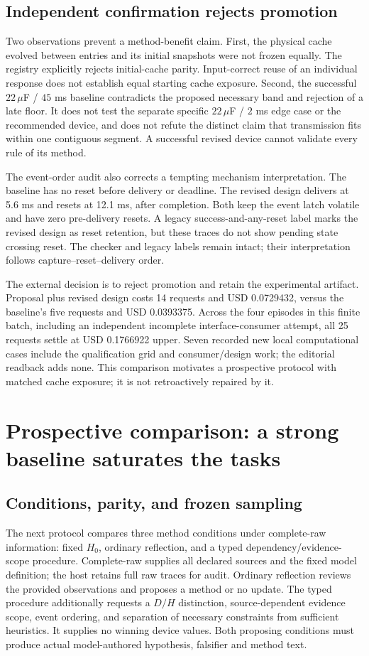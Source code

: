 \subsection{Independent confirmation rejects promotion}
Two observations prevent a method-benefit claim. First, the physical cache
evolved between entries and its initial snapshots were not frozen equally.
The registry explicitly rejects initial-cache parity. Input-correct reuse of
an individual response does not establish equal starting cache exposure.
Second, the successful $22\,\mu$F / $45$ ms baseline contradicts the proposed
necessary band and rejection of a late floor. It does not test the separate
specific $22\,\mu$F / $2$ ms edge case or the recommended device, and does not
refute the distinct claim that transmission fits within one contiguous segment.
A successful revised device cannot validate every rule of its method.

The event-order audit also corrects a tempting mechanism interpretation. The
baseline has no reset before delivery or deadline. The revised design delivers
at 5.6 ms and resets at 12.1 ms, after completion. Both keep the event latch
volatile and have zero pre-delivery resets. A legacy success-and-any-reset label
marks the revised design as reset retention, but these traces do not show pending
state crossing reset. The checker and legacy labels remain intact; their
interpretation follows capture--reset--delivery order.

The external decision is to reject promotion and retain the experimental
artifact. Proposal plus revised design costs 14 requests and USD 0.0729432,
versus the baseline's five requests and USD 0.0393375. Across the four episodes
in this finite batch, including an independent incomplete interface-consumer
attempt, all 25 requests settle at USD 0.1766922 upper. Seven recorded new local
computational cases include the qualification grid and consumer/design work;
the editorial readback adds none. This comparison motivates a prospective
protocol with matched cache exposure; it is not retroactively repaired by it.

\section{Prospective comparison: a strong baseline saturates the tasks}
\subsection{Conditions, parity, and frozen sampling}
The next protocol compares three method conditions under complete-raw information:
fixed $H_0$, ordinary reflection, and a typed dependency/evidence-scope procedure.
Complete-raw supplies all declared sources and the fixed model definition;
the host retains full raw traces for audit. Ordinary reflection reviews the
provided observations and proposes a method or no update. The typed procedure
additionally requests a $D/H$ distinction, source-dependent evidence scope,
event ordering, and separation of necessary constraints from sufficient
heuristics. It supplies no winning device values. Both proposing conditions
must produce actual model-authored hypothesis, falsifier and method text.

